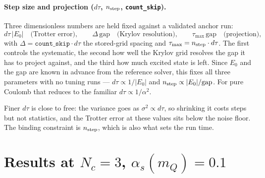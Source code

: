 \documentclass[11pt]{article}
\begin{document}
\paragraph{Step size and projection ($d\tau$, $n_{\rm step}$, \texttt{count\_skip}).}  Three
dimensionless numbers are held fixed against a validated anchor run:
\begin{equation}
  d\tau\,|E_0| \quad\text{(Trotter error)},\qquad
  \Delta\,\text{gap} \quad\text{(Krylov resolution)},\qquad
  \tau_{\max}\,\text{gap} \quad\text{(projection)},
\end{equation}
with $\Delta=\texttt{count\_skip}\cdot d\tau$ the stored-grid spacing and
$\tau_{\max}=n_{\rm step}\cdot d\tau$.  The first controls the systematic, the second how well
the Krylov grid resolves the gap it has to project against, and the third how much excited
state is left.  Since $E_0$ and the gap are known in advance from the reference solver, this
fixes all three parameters with no tuning runs --- $d\tau\propto1/|E_0|$ and
$n_{\rm step}\propto|E_0|/\text{gap}$.  For pure Coulomb that reduces to the familiar
$d\tau\propto1/\alpha^2$.

Finer $d\tau$ is close to free: the variance goes as $\sigma^2\propto d\tau$, so shrinking it
costs steps but not statistics, and the Trotter error at these values sits below the noise
floor.  The binding constraint is $n_{\rm step}$, which is also what sets the run time.

\begin{minipage}{\textwidth}
\begin{center}\small

\end{center}
\end{minipage}
\bigskip

\section{Results at $N_c=3$, $\alpha_s(m_Q)=0.1$}

\begin{center}\small

\end{center}
\bigskip
\end{document}
